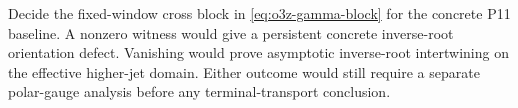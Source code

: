 \begin{openproblem}
\label{open:o3z-fixed-gamma-block}
Decide the fixed-window cross block in
\eqref{eq:o3z-gamma-block} for the concrete P11 baseline.  A nonzero witness would give
a persistent concrete inverse-root orientation defect.  Vanishing would prove
asymptotic inverse-root intertwining on the effective higher-jet domain.  Either outcome
would still require a separate polar-gauge analysis before any terminal-transport
conclusion.
\end{openproblem}
